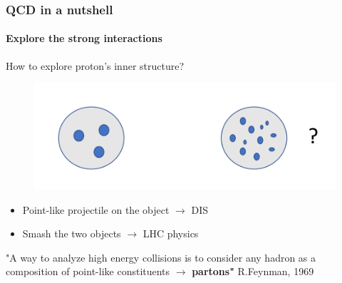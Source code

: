 \documentclass[aspectratio=43]{beamer}
\begin{document}
\begin{frame}
	
	\frametitle{QCD in a nutshell}
	\framesubtitle{Explore the strong interactions}
	
	How to explore proton's inner structure?
	
	\begin{figure}
		\includegraphics[width = 0.5\linewidth]{plots/section1/protons.png}
	\end{figure}
	
	
	\begin{itemize}
	\item Point-like projectile on the object $\longrightarrow$ DIS
	\item Smash the two objects $\longrightarrow$ LHC physics
	\end{itemize}
	
	{\color{blue}"A way to analyze high energy collisions is to consider any hadron as a composition of point-like constituents $\longrightarrow$ \textbf{partons"} } R.Feynman, 1969 

\end{frame}
\end{document}
